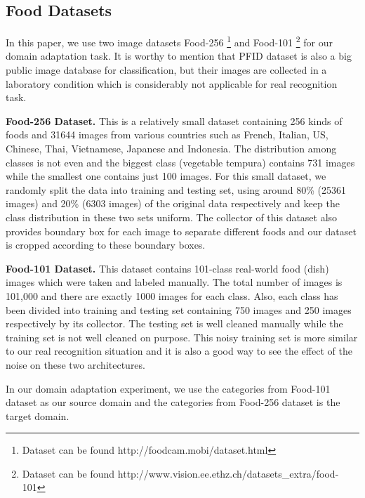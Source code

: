 \subsection{Food Datasets}
 In this paper, we use two image datasets Food-256 \cite{kawano14c}\footnote{Dataset can be found http://foodcam.mobi/dataset.html} and Food-101 \cite{bossard14}\footnote{Dataset can be found http://www.vision.ee.ethz.ch/datasets\_extra/food-101} for our domain adaptation task. It is worthy to mention that PFID dataset is also a big public image database for classification, but their images are collected in a laboratory condition which is considerably not applicable for real recognition task.

\textbf{Food-256 Dataset.}
This is a relatively small dataset containing 256 kinds of foods and 31644 images from various countries such as French, Italian, US, Chinese, Thai, Vietnamese, Japanese and Indonesia. The distribution among classes is not even and the biggest class (vegetable tempura) contains 731 images while the smallest one contains just 100 images. For this small dataset, we randomly split the data into training and testing set, using around 80\% (25361 images) and 20\% (6303 images) of the original data respectively and keep the class distribution in these two sets uniform. The collector of this dataset also provides boundary box for each image to separate different foods and our dataset is cropped according to these boundary boxes.

\textbf{Food-101 Dataset.}
This dataset contains 101-class real-world food (dish) images which were taken and labeled manually. The total number of images is 101,000 and there are exactly 1000 images for each class. Also, each class has been divided into training and testing set containing 750 images and 250 images respectively by its collector. The testing set is well cleaned manually while the training set is not well cleaned on purpose. This noisy training set is more similar to our real recognition situation and it is also a good way to see the effect of the noise on these two architectures.

In our domain adaptation experiment, we use the categories from Food-101 dataset as our source domain and the categories from Food-256 dataset is the target domain.
